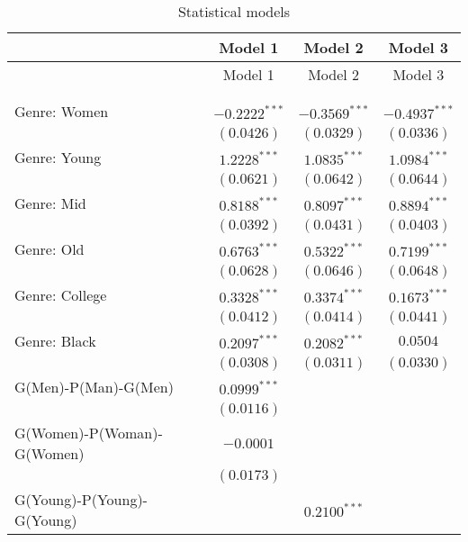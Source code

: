 
\begin{center}
\begin{longtable}{l c c c}
\toprule
 & Model 1 & Model 2 & Model 3 \\
\midrule
\endfirsthead
\toprule
 & Model 1 & Model 2 & Model 3 \\
\midrule
\endhead
\bottomrule
\endfoot
\bottomrule
\multicolumn{4}{l}{\scriptsize{$^{***}p<0.001$; $^{**}p<0.01$; $^{*}p<0.05$}}\\
\caption{Statistical models}
\label{table:coefficients}
\endlastfoot \\
Genre: Women               & $-0.2222^{***}$ & $-0.3569^{***}$ & $-0.4937^{***}$ \\
                           & $(0.0426)$      & $(0.0329)$      & $(0.0336)$      \\
Genre: Young               & $1.2228^{***}$  & $1.0835^{***}$  & $1.0984^{***}$  \\
                           & $(0.0621)$      & $(0.0642)$      & $(0.0644)$      \\
Genre: Mid                 & $0.8188^{***}$  & $0.8097^{***}$  & $0.8894^{***}$  \\
                           & $(0.0392)$      & $(0.0431)$      & $(0.0403)$      \\
Genre: Old                 & $0.6763^{***}$  & $0.5322^{***}$  & $0.7199^{***}$  \\
                           & $(0.0628)$      & $(0.0646)$      & $(0.0648)$      \\
Genre: College             & $0.3328^{***}$  & $0.3374^{***}$  & $0.1673^{***}$  \\
                           & $(0.0412)$      & $(0.0414)$      & $(0.0441)$      \\
Genre: Black               & $0.2097^{***}$  & $0.2082^{***}$  & $0.0504$        \\
                           & $(0.0308)$      & $(0.0311)$      & $(0.0330)$      \\
G(Men)-P(Man)-G(Men)       & $0.0999^{***}$  &                 &                 \\
                           & $(0.0116)$      &                 &                 \\
G(Women)-P(Woman)-G(Women) & $-0.0001$       &                 &                 \\
                           & $(0.0173)$      &                 &                 \\
G(Young)-P(Young)-G(Young) &                 & $0.2100^{***}$  &                 \\

\end{longtable}
\end{center}
